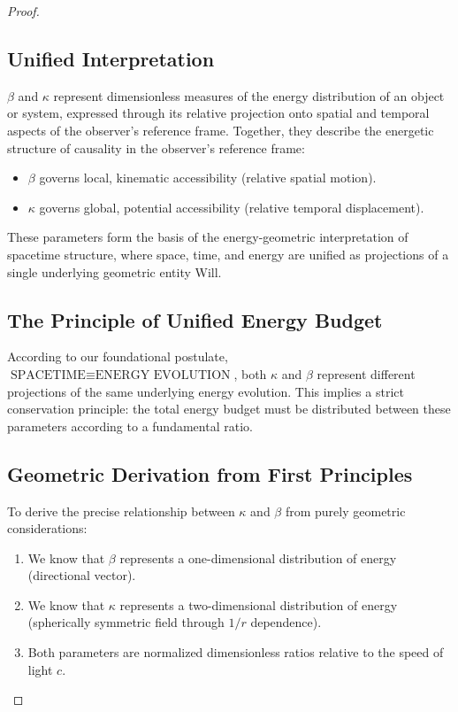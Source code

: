 \documentclass{article}
\begin{document}
\begin{proof}
\subsection{Unified Interpretation}
 \(\beta\) and \(\kappa\) represent dimensionless measures of the energy distribution of an object or system, expressed through its relative projection onto spatial and temporal aspects of the observer's reference frame.
Together, they describe the energetic structure of causality in the observer's reference frame:
\begin{itemize}
    \item \(\beta\) governs local, kinematic accessibility (relative spatial motion).
    \item \(\kappa\) governs global, potential accessibility (relative temporal displacement).
\end{itemize}
These parameters form the basis of the energy-geometric interpretation of spacetime structure, where space, time, and energy are unified as projections of a single underlying geometric entity Will.


\subsection{The Principle of Unified Energy Budget}

According to our foundational postulate, $\text{SPACETIME} \equiv \text{ENERGY EVOLUTION}$, both $\kappa$ and $\beta$ represent different projections of the same underlying energy evolution. This implies a strict conservation principle: the total energy budget must be distributed between these parameters according to a fundamental ratio.

\subsection{Geometric Derivation from First Principles}

To derive the precise relationship between $\kappa$ and $\beta$ from purely geometric considerations:

\begin{enumerate}
    \item We know that $\beta$ represents a one-dimensional distribution of energy (directional vector).
    \item We know that $\kappa$ represents a two-dimensional distribution of energy (spherically symmetric field through $1/r$ dependence).
    \item Both parameters are normalized dimensionless ratios relative to the speed of light $c$.
\end{enumerate}


\end{proof}
\end{document}
